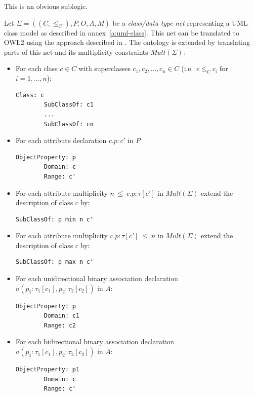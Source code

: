 \documentclass[10pt, a4paper]{isov2}
\begin{document}

This is an obvious sublogic.


Let $\Sigma = ((C, {\leq_C}), P, O, A, M)$ be a \emph{class/data type net} representing a UML 
class model as described in annex~\ref{a:uml-class}. This net can be translated to OWL2 using the approach described in \cite{zedlitz2012uml}.
The ontology is extended by translating parts of this net and its multiplicity constraints $\mathit{Mult}(\Sigma)$:
\begin{itemize}
\item For each class $c \in C$ with superclasses $c_1,c_2,\ldots,c_n \in C$ (i.e.\ $c \leq_C c_i$ for $i=1,\ldots,n$):
\begin{lstlisting}[language=owl2Manchester]
	Class: c
		SubClassOf: c1
		...
		SubClassOf: cn
\end{lstlisting}
\item For each attribute declaration $c.p:c'$ in $P$
\begin{lstlisting}[language=owl2Manchester]
	ObjectProperty: p
		Domain: c
		Range: c'
\end{lstlisting}

\item For each attribute multiplicity $n\ \mathsf{\leq}\ c.p:\tau[c']$ in $\mathit{Mult}(\Sigma)$ extend the description of class $c$ by:
\begin{lstlisting}[language=owl2Manchester]
	SubClassOf: p min n c'
\end{lstlisting}

\item For each attribute multiplicity $ c.p:\tau[c'] \ \mathsf{\leq}\ n$  in $\mathit{Mult}(\Sigma)$ extend the description of class $c$ by:
\begin{lstlisting}[language=owl2Manchester]
	SubClassOf: p max n c'
\end{lstlisting}

\item For each unidirectional binary association declaration $a(p_1:\tau_1[c_1],p_2:\tau_2[c_2])$ in $A$:
\begin{lstlisting}[language=owl2Manchester]
	ObjectProperty: p
		Domain: c1
		Range: c2
\end{lstlisting}
\item For each bidirectional binary association declaration $a(p_1:\tau_1[c_1],p_2:\tau_2[c_2])$ in $A$:
\begin{lstlisting}[language=owl2Manchester]
	ObjectProperty: p1
		Domain: c
		Range: c'


\end{lstlisting}
\end{itemize}
\end{document}
